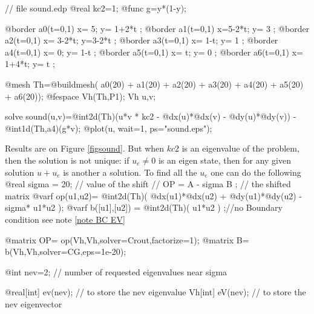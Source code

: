 \documentclass[a4paper,twoside,12pt]{book}
\begin{document}
\begin{example}
\bFF
// file sound.edp
@real kc2=1;
@func g=y*(1-y);

@border a0(t=0,1) { x= 5; y= 1+2*t ;}
@border a1(t=0,1) { x=5-2*t; y= 3 ;}
@border a2(t=0,1) { x= 3-2*t; y=3-2*t ;}
@border a3(t=0,1) { x= 1-t; y= 1 ;}
@border a4(t=0,1) { x= 0; y= 1-t ;}
@border a5(t=0,1) { x= t; y= 0  ;}
@border a6(t=0,1) { x= 1+4*t; y= t ;}

@mesh Th=@buildmesh( a0(20) + a1(20) + a2(20)
        + a3(20) + a4(20) + a5(20) + a6(20));
@fespace Vh(Th,P1);
Vh u,v;

solve sound(u,v)=@int2d(Th)(u*v * kc2 - @dx(u)*@dx(v) - @dy(u)*@dy(v))
                 - @int1d(Th,a4)(g*v);
@plot(u, wait=1, ps="sound.eps");
\eFF
\end{example}

Results are on Figure \ref{figsound}.  But when $kc2$ is an eigenvalue of the problem, then the
solution is not unique:
if $u_e \neq 0$ is an eigen state, then for any given solution $u+u_e$ is another  a solution.
To find all the $u_e$ one can do the following
\bFF
@real sigma = 20;  // value of the shift
// OP = A - sigma B ;  //  the shifted matrix
@varf  op(u1,u2)= @int2d(Th)(  @dx(u1)*@dx(u2) + @dy(u1)*@dy(u2) - sigma* u1*u2 );
@varf b([u1],[u2]) = @int2d(Th)( u1*u2 ) ;//no Boundary condition see note \ref{note BC EV}

@matrix OP= op(Vh,Vh,solver=Crout,factorize=1);
@matrix B= b(Vh,Vh,solver=CG,eps=1e-20);

@int nev=2;  // number of requested eigenvalues near sigma

@real[int] ev(nev); // to store the  nev eigenvalue
Vh[int] eV(nev);   // to store the nev eigenvector
\end{document}
